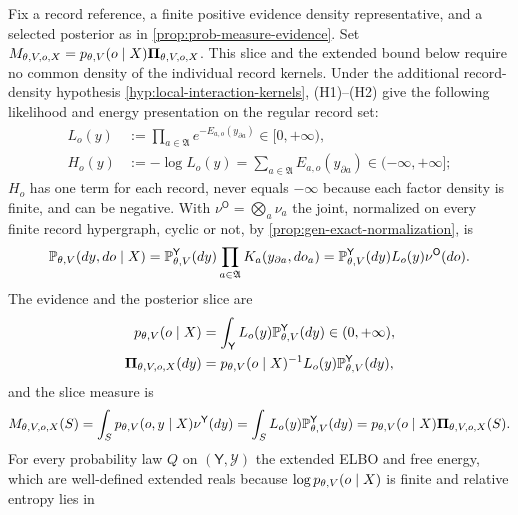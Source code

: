\label{thm:obs-collective-vfe}
Fix a record reference, a finite positive evidence density representative,
and a selected posterior as in \cref{prop:prob-measure-evidence}.
Set $M_{\theta,V,o,X}=p_{\theta,V}(o\mid X)\boldsymbol\Pi_{\theta,V,o,X}$.
This slice and the extended bound below require no common density of the
individual record kernels. Under the additional record-density hypothesis
\cref{hyp:local-interaction-kernels}, (H1)--(H2) give the following
likelihood and energy presentation on the regular record set:
\begin{align}
L_o(y)&:=\prod_{a\in\mathfrak A}e^{-E_{a,o}(y_{\partial a})}\in[0,+\infty),
\label{eq:obs-complete-record-likelihood}\\
H_o(y)&:=-\log L_o(y)=\sum_{a\in\mathfrak A}E_{a,o}(y_{\partial a})
\in(-\infty,+\infty];
\label{eq:obs-interaction-energy}
\end{align}
$H_o$ has one term for each record, never equals $-\infty$ because each factor
density is finite, and can be negative. With $\nu^{\mathsf O}=\bigotimes_a\nu_a$
the joint, normalized on every finite record hypergraph, cyclic or not, by
\cref{prop:gen-exact-normalization}, is
\begin{equation}
\mathbb P_{\theta,V}(dy,do\mid X)
=\mathbb P^{\mathsf Y}_{\theta,V}(dy)\prod_{a\in\mathfrak A}K_a(y_{\partial a},do_a)
=\mathbb P^{\mathsf Y}_{\theta,V}(dy)L_o(y)\nu^{\mathsf O}(do).
\label{eq:obs-interaction-joint}
\end{equation}
The evidence and the posterior slice are
\begin{align}
p_{\theta,V}(o\mid X)&=\int_{\mathsf Y}L_o(y)\mathbb P^{\mathsf Y}_{\theta,V}(dy)\in(0,+\infty),
\label{eq:obs-global-evidence}\\
\boldsymbol\Pi_{\theta,V,o,X}(dy)&=p_{\theta,V}(o\mid X)^{-1}L_o(y)\mathbb P^{\mathsf Y}_{\theta,V}(dy),
\label{eq:obs-global-posterior}
\end{align}
and the slice measure is
\begin{equation}
M_{\theta,V,o,X}(S)=\int_Sp_{\theta,V}(o,y\mid X)\nu^{\mathsf Y}(dy)
=\int_SL_o(y)\mathbb P^{\mathsf Y}_{\theta,V}(dy)
=p_{\theta,V}(o\mid X)\boldsymbol\Pi_{\theta,V,o,X}(S).
\label{eq:elbo-slice-measure}
\end{equation}
For every probability law $Q$ on $(\mathsf Y,\mathscr Y)$ the extended ELBO and
free energy, which are well-defined extended reals because
$\log p_{\theta,V}(o\mid X)$ is finite and relative entropy lies in
